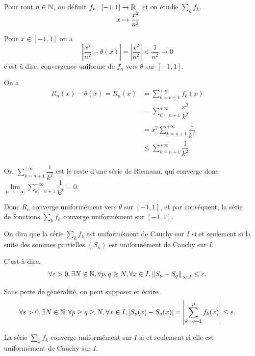 \documentclass[a4paper,12pt]{article}
\begin{document}
\begin{exemple}
    Pour tout $n \in \mathbb{N}$, on définit $\funcdef{f_n}{[-1, 1]}{\R}{x}{\dfrac{x^2}{n^2}}$ et on étudie $\sum\limits_k f_k$.

    Pour $x \in [-1, 1]$ on a 
    $$
    \left|\dfrac{x^2}{n^2} - \theta(x)\right| = \left|\dfrac{x^2}{n^2}\right| < \dfrac{1}{n^2} \to 0
    $$
    c'est-à-dire, convergence uniforme de $f_n$ vers $\theta$ sur $[-1, 1]$.

    On a
    \begin{align*}
        R_n(x) - \theta(x) = R_n(x) &= \sum_{k=n+1}^{+\infty} f_k(x) \\
        &= \sum_{k=n+1}^{+\infty} \dfrac{x^2}{k^2} \\
        &= x^2 \sum_{k=n+1}^{+\infty} \dfrac{1}{k^2} \\
        &\leq \sum_{k=n+1}^{+\infty} \dfrac{1}{k^2}
    \end{align*}

    Or, $\sum\limits_{k=n+1}^{+\infty} \dfrac{1}{k^2}$ est le reste d'une série de Riemann, qui converge donc $\lim\limits_{n \to +\infty} \sum\limits_{k=n+1}^{+\infty} \dfrac{1}{k^2} = 0$.

    Donc $R_n$ converge uniformément vers $\theta$ sur $[-1, 1]$, et par conséquent, la série de fonctions $\sum\limits_k f_k$ converge uniformément sur $[-1, 1]$.
\end{exemple}

\clearpage

\begin{definition}
    On dira que la série $\sum\limits_k f_k$ est uniformément de Cauchy sur $I$ si et seulement si
    la suite des sommes partielles $(S_n)$ est uniformément de Cauchy sur $I$.

    C'est-à-dire,
    $$
    \forall \varepsilon > 0, \exists N \in \mathbb{N}, \forall p,q \geq N, \forall x \in I, \left\lVert S_p - S_q\right\rVert_{\infty, I} \leq \varepsilon.
    $$
\end{definition}

\begin{remarque}
    Sans perte de généralité, on peut supposer  et écrire
    $$
    \forall \varepsilon > 0, \exists N \in \mathbb{N}, \forall p \geq q \geq N, \forall x \in I, |S_p(x) - S_q(x)| = \left|\sum_{k=q+1}^p f_k(x)\right| \leq \varepsilon.
    $$
\end{remarque}

\begin{proposition}{}{}
    La série $\sum\limits_k f_k$ converge uniformément sur $I$ si et seulement si elle est uniformément de Cauchy sur $I$.
\end{proposition}
\end{document}
